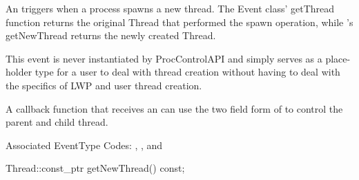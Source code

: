 
An  triggers when a process spawns a new thread. The Event
class' getThread function returns the original Thread that performed the spawn
operation, while 's getNewThread returns the newly created
Thread.

This event is never instantiated by ProcControlAPI and simply serves as a
place-holder type for a user to deal with thread creation without having to deal
with the specifics of LWP and user thread creation.

A callback function that receives an  can use the two field
form of   to control the parent and child thread.

Associated EventType Codes: , , and

\begin{apient}
Thread::const_ptr getNewThread() const;
\end{apient}

